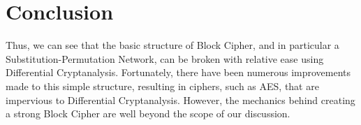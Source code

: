 



\chapter{Conclusion} \label{c:conclusion}

Thus, we can see that the basic structure of Block Cipher, and in particular a
Substitution-Permutation Network, can be broken with relative ease using
Differential Cryptanalysis. Fortunately, there have been numerous improvements
made to this simple structure, resulting in ciphers, such as AES, that are
impervious to Differential Cryptanalysis. However, the mechanics behind creating
a strong Block Cipher are well beyond the scope of our discussion.
